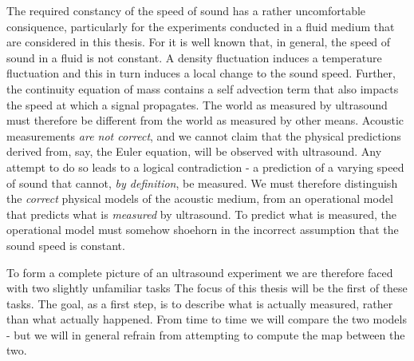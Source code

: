 The required constancy of the speed of sound has a rather uncomfortable consiquence,
particularly for the experiments conducted in a fluid medium that are considered in this thesis.
For it is well known that, in general, the speed of sound in a fluid is not constant.
A density fluctuation induces a temperature fluctuation and this in turn induces a local change to the sound speed.
Further, the continuity equation of mass contains a self advection term that also impacts the speed at which a signal propagates.
The world as measured by ultrasound must therefore be different from the world as measured by other means.
Acoustic measurements {\em are not correct}, 
and we cannot claim that the physical predictions derived from, say, the Euler equation,
will be observed with ultrasound.
Any attempt to do so leads to a logical contradiction -
a prediction of a varying speed of sound that cannot, {\em by definition}, be measured.
We must therefore distinguish the {\em correct} physical models of the acoustic medium,
from an operational model that predicts what is {\em measured} by ultrasound. 
To predict what is measured,
the operational model must somehow shoehorn in the incorrect assumption that the sound speed is constant.


To form a complete picture of an ultrasound experiment we are therefore faced with two slightly unfamiliar tasks
The focus of this thesis will be the first of these tasks.
The goal, as a first step, is to describe what is actually measured,
rather than what actually happened.
From time to time we will compare the two models -
but we will in general refrain from attempting to compute the map between the two.

